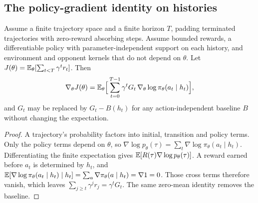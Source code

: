 \subsection{The policy-gradient identity on histories}
\begin{theorem}
\label{thm:gradient}
Assume a finite trajectory space and a finite horizon $T$, padding terminated
trajectories with zero-reward absorbing steps. Assume bounded rewards, a
differentiable policy with parameter-independent support on each history, and
environment and opponent kernels that do not depend on $\theta$. Let
$J(\theta)=\mathbb{E}_\theta[\sum_{t<T}\gamma^tr_t]$. Then
\begin{equation}
  \nabla_\theta J(\theta)=
  \mathbb{E}_\theta\Big[\sum_{t=0}^{T-1}\gamma^tG_t\,
       \nabla_\theta\log\pi_\theta(a_t\mid h_t)\Big],
\label{eq:gradient}
\end{equation}
and $G_t$ may be replaced by $G_t-B(h_t)$ for any action-independent baseline
$B$ without changing the expectation.
\end{theorem}
\begin{proof}
A trajectory's probability factors into initial, transition and policy terms.
Only the policy terms depend on $\theta$, so
$\nabla\log p_\theta(\tau)=\sum_t\nabla\log\pi_\theta(a_t\mid h_t)$.
Differentiating the finite expectation gives $\mathbb{E}[R(\tau)\nabla\log
p_\theta(\tau)]$. A reward earned before $a_t$ is determined by $h_t$, and
$\mathbb{E}[\nabla\log\pi_\theta(a_t\mid h_t)\mid h_t]=\sum_a\nabla\pi_\theta(a\mid
h_t)=\nabla1=0$. Those cross terms therefore vanish, which leaves
$\sum_{j\ge t}\gamma^jr_j=\gamma^tG_t$. The same zero-mean identity removes the
baseline.
\end{proof}



